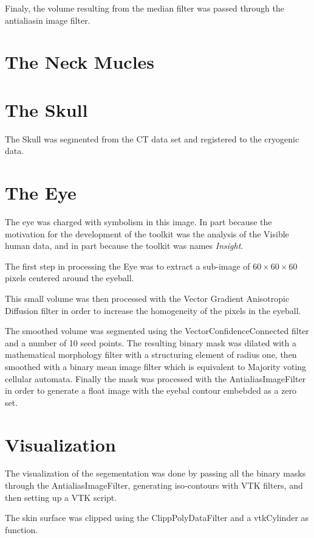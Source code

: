 Finaly, the volume resulting from the median filter was passed through the 
antialiasin image filter.


\section{The Neck Mucles}

\section{The Skull}
The Skull was segmented from the CT data set and registered to the cryogenic data.

\section{The Eye} 
The eye was charged with symbolism in this image. In part because the
motivation for the development of the toolkit was the analysis of the Visible
human data, and in part because the toolkit was names \emph{Insight}.

The first step in processing the Eye was to extract a sub-image of
$60\times60\times60$ pixels centered around the eyeball.

This small volume was then processed with the Vector Gradient Anisotropic
Diffusion filter in order to increase the homogeneity of the pixels in the 
eyeball.

The smoothed volume was segmented using the VectorConfidenceConnected filter
and a number of 10 seed points. The resulting binary mask was dilated with 
a mathematical morphology filter with a structuring element of radius one, then
smoothed with a binary mean image filter which is equivalent to Majority voting
cellular automata. Finally the mask was processed with the AntialiasImageFilter
in order to generate a float image with the eyebal contour embebded as a zero
set.


\section{Visualization}

The visualization of the segementation was done by passing all the binary 
masks through the AntialiasImageFilter, generating iso-contours with VTK
filters, and then setting up a VTK script.

The skin surface was clipped using the ClippPolyDataFilter and a vtkCylinder
as function.
